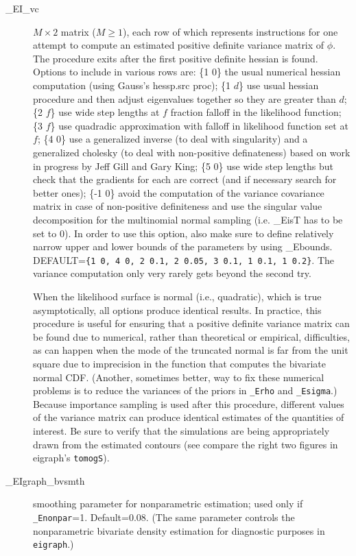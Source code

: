 \documentclass[11pt,titlepage]{article}
\begin{document}
\begin{description}
\item[\_EI\_vc] $M\times 2$ matrix ($M\geq 1$), each row of which
  represents instructions for one attempt to compute an estimated
  positive definite variance matrix of $\phi$.  The procedure exits
  after the first positive definite hessian is found.  Options to
  include in various rows are: \{1 0\} the usual numerical hessian
  computation (using Gauss's hessp.src proc); \{1 $d$\} use usual
  hessian procedure and then adjust eigenvalues together so they are
  greater than $d$; \{2 $f$\} use wide step lengths at $f$ fraction
  falloff in the likelihood function; \{3 $f$\} use quadradic
  approximation with falloff in likelihood function set at $f$; \{4
  0\} use a generalized inverse (to deal with singularity) and a
  generalized cholesky (to deal with non-positive definateness) based
  on work in progress by Jeff Gill and Gary King; \{5 0\} use wide
  step lengths but check that the gradients for each are correct (and
  if necessary search for better ones); \{-1 0\} avoid the computation
  of the variance covariance matrix in case of non-positive
  definiteness and use the singular value decomposition for the
  multinomial normal sampling (i.e. \_EisT has to be set to 0). In
  order to use this option, also make sure to define relatively narrow
  upper and lower bounds of the parameters by using \_Ebounds.
  DEFAULT=\texttt{\{1 0, 4 0, 2 0.1, 2 0.05, 3 0.1, 1 0.1, 1 0.2\}}.
  The variance computation only very rarely gets beyond the second
  try.

  When the likelihood surface is normal (i.e., quadratic), which is
  true asymptotically, all options produce identical results.  In
  practice, this procedure is useful for ensuring that a positive
  definite variance matrix can be found due to numerical, rather than
  theoretical or empirical, difficulties, as can happen when the mode
  of the truncated normal is far from the unit square due to
  imprecision in the function that computes the bivariate normal CDF.
  (Another, sometimes better, way to fix these numerical problems is
  to reduce the variances of the priors in \texttt{\_Erho} and
  \texttt{\_Esigma}.)  Because importance sampling is used after this
  procedure, different values of the variance matrix can produce
  identical estimates of the quantities of interest.  Be sure to
  verify that the simulations are being appropriately drawn from the
  estimated contours (see compare the right two figures in eigraph's
  \texttt{tomogS}).

\item[\_EIgraph\_bvsmth] smoothing parameter for nonparametric
  estimation; used only if \texttt{\_Enonpar}=1. Default=0.08.  (The
  same parameter controls the nonparametric bivariate density
  estimation for diagnostic purposes in \texttt{eigraph}.)


\end{description}
\end{document}
